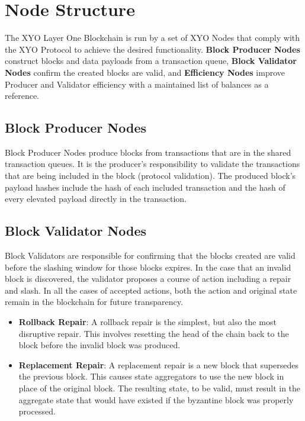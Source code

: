 \documentclass{article}
\begin{document}
\section{Node Structure}
The XYO Layer One Blockchain is run by a set of XYO Nodes that comply with the
XYO Protocol to achieve the desired functionality. \textbf{Block Producer
    Nodes} construct blocks and data payloads from a transaction queue,
\textbf{Block Validator Nodes} confirm the created blocks are valid, and
\textbf{Efficiency Nodes} improve Producer and Validator efficiency with a
maintained list of balances as a reference.

\subsection{Block Producer Nodes}
Block Producer Nodes produce blocks from transactions that are in the shared
transaction queues. It is the producer’s responsibility to validate the
transactions that are being included in the block (protocol validation). The
produced block’s payload hashes include the hash of each included transaction
and the hash of every elevated payload directly in the transaction.

\subsection{Block Validator Nodes}
Block Validators are responsible for confirming that the blocks created are
valid before the slashing window for those blocks expires. In the case that an
invalid block is discovered, the validator proposes a course of action
including a repair and slash. In all the cases of accepted actions, both the
action and original state remain in the blockchain for future transparency.

\begin{itemize}
    \item \textbf{Rollback Repair}: A rollback repair is the simplest, but also the most disruptive repair. This involves resetting the head of the chain back to the block before the invalid block was produced.
    \item \textbf{Replacement Repair}: A replacement repair is a new block that supersedes the previous block. This causes state aggregators to use the new block in place of the original block. The resulting state, to be valid, must result in the aggregate state that would have existed if the byzantine block was properly processed.
\end{itemize}
\end{document}
